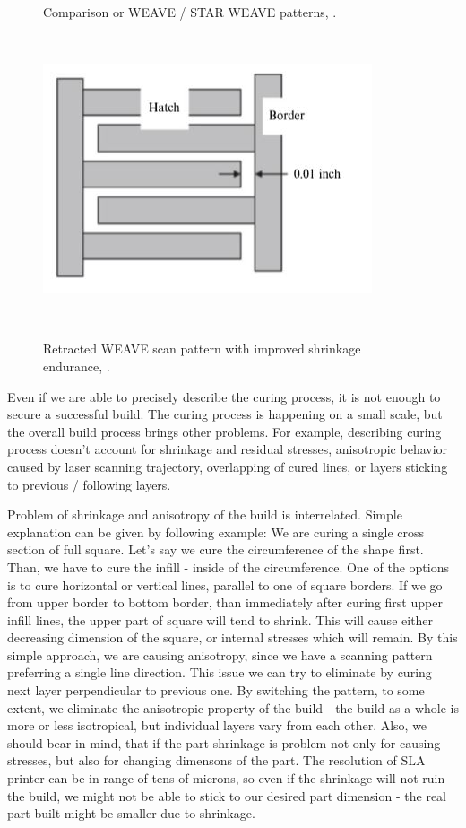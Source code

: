 \documentclass[a4paper, 11pt, reqno]{report}
\begin{document}
\begin{figure}[b!]
\begin{minipage}[t]{0.45\textwidth}
    \caption{Comparison or WEAVE / STAR WEAVE patterns, \cite[p. 88]{AMT}.}
  \end{minipage}
  \\[10pt]
  \begin{minipage}[t]{\textwidth}
  \centering
  \includegraphics[scale=0.8]{retractedWeave}
  \caption{Retracted WEAVE scan pattern with improved shrinkage endurance, \cite[p. 90]{AMT}.}
  \end{minipage}
  \\[20pt]
\end{figure}
%
Even if we are able to precisely describe the curing process, it is not enough to secure a successful build. The curing process is happening on a small scale, but the overall build process brings other problems. For example, describing curing process doesn't account for shrinkage and residual stresses, anisotropic behavior caused by laser scanning trajectory, overlapping of cured lines, or layers sticking to previous / following layers.
	
	Problem of shrinkage and anisotropy of the build is interrelated. Simple explanation can be given by following example: We are curing a single cross section of full square. Let's say we cure the circumference of the shape first. Than, we have to cure the infill - inside of the circumference. One of the options is to cure horizontal or vertical lines, parallel to one of square borders. If we go from upper border to bottom border, than immediately after curing first upper infill lines, the upper part of square will tend to shrink. This will cause either decreasing dimension of the square, or internal stresses which will remain.  By this simple approach, we are causing anisotropy, since we have a scanning pattern preferring a single line direction. This issue we can try to eliminate by curing next layer perpendicular to previous one. By switching the pattern, to some extent, we eliminate the anisotropic property of the build - the build as a whole is more or less isotropical, but individual layers vary from each other. Also, we should bear in mind, that if the part shrinkage is problem not only for causing stresses, but also for changing dimensons of the part. The resolution of SLA printer can be in range of tens of microns, so even if the shrinkage will not ruin the build, we might not be able to stick to our desired part dimension - the real part built might be smaller due to shrinkage.
	
\end{document}
